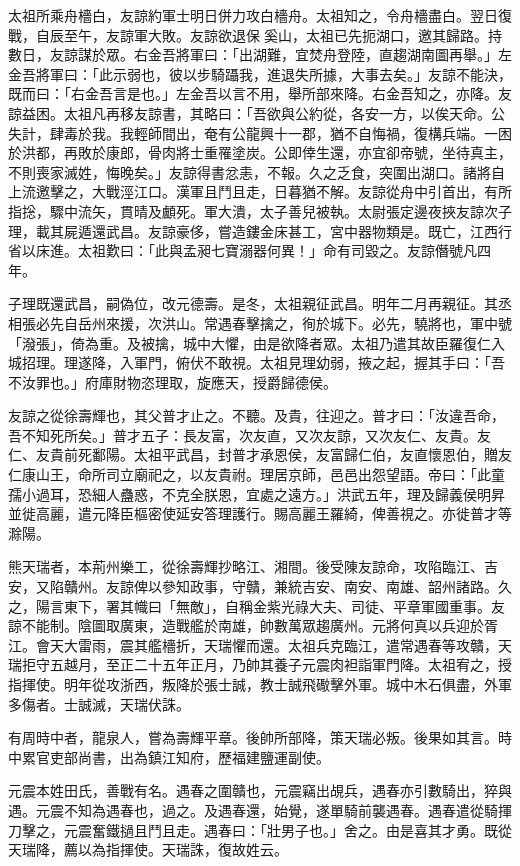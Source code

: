 太祖所乘舟檣白，友諒約軍士明日併力攻白檣舟。太祖知之，令舟檣盡白。翌日復戰，自辰至午，友諒軍大敗。友諒欲退保奚山，太祖已先扼湖口，邀其歸路。持數日，友諒謀於眾。右金吾將軍曰：「出湖難，宜焚舟登陸，直趨湖南圖再舉。」左金吾將軍曰：「此示弱也，彼以步騎躡我，進退失所據，大事去矣。」友諒不能決，既而曰：「右金吾言是也。」左金吾以言不用，舉所部來降。右金吾知之，亦降。友諒益困。太祖凡再移友諒書，其略曰：「吾欲與公約從，各安一方，以俟天命。公失計，肆毒於我。我輕師間出，奄有公龍興十一郡，猶不自悔禍，復構兵端。一困於洪都，再敗於康郎，骨肉將士重罹塗炭。公即倖生還，亦宜卻帝號，坐待真主，不則喪家滅姓，悔晚矣。」友諒得書忿恚，不報。久之乏食，突圍出湖口。諸將自上流邀擊之，大戰涇江口。漢軍且鬥且走，日暮猶不解。友諒從舟中引首出，有所指捴，驟中流矢，貫晴及顱死。軍大潰，太子善兒被執。太尉張定邊夜挾友諒次子理，載其屍遁還武昌。友諒豪侈，嘗造鏤金床甚工，宮中器物類是。既亡，江西行省以床進。太祖歎曰：「此與孟昶七寶溺器何異！」命有司毀之。友諒僭號凡四年。

子理既還武昌，嗣偽位，改元德壽。是冬，太祖親征武昌。明年二月再親征。其丞相張必先自岳州來援，次洪山。常遇春擊擒之，徇於城下。必先，驍將也，軍中號「潑張」，倚為重。及被擒，城中大懼，由是欲降者眾。太祖乃遣其故臣羅復仁入城招理。理遂降，入軍門，俯伏不敢視。太祖見理幼弱，掖之起，握其手曰：「吾不汝罪也。」府庫財物恣理取，旋應天，授爵歸德侯。

友諒之從徐壽輝也，其父普才止之。不聽。及貴，往迎之。普才曰：「汝違吾命，吾不知死所矣。」普才五子：長友富，次友直，又次友諒，又次友仁、友貴。友仁、友貴前死鄱陽。太祖平武昌，封普才承恩侯，友富歸仁伯，友直懷恩伯，贈友仁康山王，命所司立廟祀之，以友貴祔。理居京師，邑邑出怨望語。帝曰：「此童孺小過耳，恐細人蠱惑，不克全朕恩，宜處之遠方。」洪武五年，理及歸義侯明昇並徙高麗，遣元降臣樞密使延安答理護行。賜高麗王羅綺，俾善視之。亦徙普才等滁陽。

熊天瑞者，本荊州樂工，從徐壽輝抄略江、湘間。後受陳友諒命，攻陷臨江、吉安，又陷贛州。友諒俾以參知政事，守贛，兼統吉安、南安、南雄、韶州諸路。久之，陽言東下，署其幟曰「無敵」，自稱金紫光祿大夫、司徒、平章軍國重事。友諒不能制。陰圖取廣東，造戰艦於南雄，帥數萬眾趨廣州。元將何真以兵迎於胥江。會天大雷雨，震其艦檣折，天瑞懼而還。太祖兵克臨江，遣常遇春等攻贛，天瑞拒守五越月，至正二十五年正月，乃帥其養子元震肉袒詣軍門降。太祖宥之，授指揮使。明年從攻浙西，叛降於張士誠，教士誠飛礮擊外軍。城中木石俱盡，外軍多傷者。士誠滅，天瑞伏誅。

有周時中者，龍泉人，嘗為壽輝平章。後帥所部降，策天瑞必叛。後果如其言。時中累官吏部尚書，出為鎮江知府，歷福建鹽運副使。

元震本姓田氏，善戰有名。遇春之圍贛也，元震竊出覘兵，遇春亦引數騎出，猝與遇。元震不知為遇春也，過之。及遇春還，始覺，遂單騎前襲遇春。遇春遣從騎揮刀擊之，元震奮鐵撾且鬥且走。遇春曰：「壯男子也。」舍之。由是喜其才勇。既從天瑞降，薦以為指揮使。天瑞誅，復故姓云。


